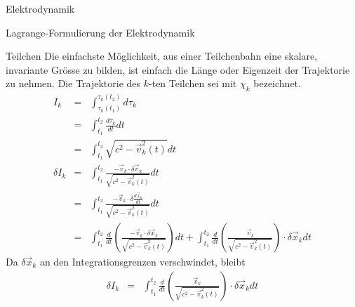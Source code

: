 \begin{chapter}{\titlestr}
\begin{section}{Elektrodynamik}
\begin{subsection}{Lagrange-Formulierung der Elektrodynamik}
\begin{subsubsection}{Teilchen}
Die einfachste Möglichkeit, aus einer Teilchenbahn eine skalare, invariante Grösse zu bilden, ist einfach die Länge oder Eigenzeit
der Trajektorie zu nehmen. Die Trajektorie des $k$-ten Teilchen sei mit $\chi_k$ bezeichnet.
\begin{eqnarray*}
I_k &=& \int_{\tau_k(t_1)}^{\tau_k(t_2)} d\tau_k\\
&=& \int_{t_1}^{t_2} \frac{d\tau_k}{dt}dt\\
&=& \int_{t_1}^{t_2} \sqrt{c^2-\vec{v}_k^2(t)}dt\\
\delta I_k &=&\int_{t_1}^{t_2} \frac{-\vec{v}_k\cdot\delta\vec{v}_k}{\sqrt{c^2-\vec{v}_k^2(t)}}dt\\
&=&\int_{t_1}^{t_2} \frac{-\vec{v}_k\cdot\delta\frac{d\vec{x}_k}{dt}}{\sqrt{c^2-\vec{v}_k^2(t)}}dt\\
&=&\int_{t_1}^{t_2} \frac{d}{dt}\left(\frac{-\vec{v}_k\cdot\delta \vec{x}_k}{\sqrt{c^2-\vec{v}_k^2(t)}}\right)dt
+\int_{t_1}^{t_2} \frac{d}{dt}\left(\frac{\vec{v}_k}{\sqrt{c^2-\vec{v}_k^2(t)}}\right)\cdot\delta \vec{x}_kdt
\end{eqnarray*}
Da $\delta \vec{x}_k$ an den Integrationsgrenzen verschwindet, bleibt
\begin{eqnarray*}
\delta I_k &=& \int_{t_1}^{t_2} \frac{d}{dt}\left(\frac{\vec{v}_k}{\sqrt{c^2-\vec{v}_k^2(t)}}\right)\cdot\delta \vec{x}_kdt
\end{eqnarray*}
\end{subsubsection}


\end{subsection}
\end{section}
\end{chapter}
